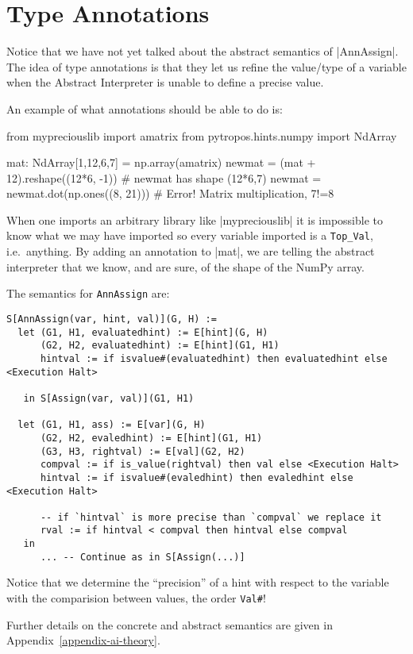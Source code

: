 \section{Type Annotations}

Notice that we have not yet talked about the abstract semantics of \pycode|AnnAssign|.
The idea of type annotations is that they let us refine the value/type of a variable when
the Abstract Interpreter is unable to define a precise value.

An example of what annotations should be able to do is:

\begin{pythoncode}
from mypreciouslib import amatrix
from pytropos.hints.numpy import NdArray

mat: NdArray[1,12,6,7] = np.array(amatrix)
newmat = (mat + 12).reshape((12*6, -1))  # newmat has shape (12*6,7)
newmat = newmat.dot(np.ones((8, 21)))  # Error! Matrix multiplication, 7!=8
\end{pythoncode}

When one imports an arbitrary library like \pycode|mypreciouslib| it is
impossible to know what we may have imported so every variable imported
is a \verb|Top_Val|, i.e.~anything. By adding an annotation to
\pycode|mat|, we are telling the abstract interpreter that we know, and
are sure, of the shape of the NumPy array.

The semantics for \texttt{AnnAssign} are:

\begin{verbatim}
S[AnnAssign(var, hint, val)](G, H) :=
  let (G1, H1, evaluatedhint) := E[hint](G, H)
      (G2, H2, evaluatedhint) := E[hint](G1, H1)
      hintval := if isvalue#(evaluatedhint) then evaluatedhint else <Execution Halt>

   in S[Assign(var, val)](G1, H1)

  let (G1, H1, ass) := E[var](G, H)
      (G2, H2, evaledhint) := E[hint](G1, H1)
      (G3, H3, rightval) := E[val](G2, H2)
      compval := if is_value(rightval) then val else <Execution Halt>
      hintval := if isvalue#(evaledhint) then evaledhint else <Execution Halt>

      -- if `hintval` is more precise than `compval` we replace it
      rval := if hintval < compval then hintval else compval
   in
      ... -- Continue as in S[Assign(...)]
\end{verbatim}

Notice that we determine the \enquote{precision} of a hint with respect to the variable
with the comparision between values, the order \verb|Val#|!

Further details on the concrete and abstract semantics are given in Appendix~\ref{appendix-ai-theory}.
